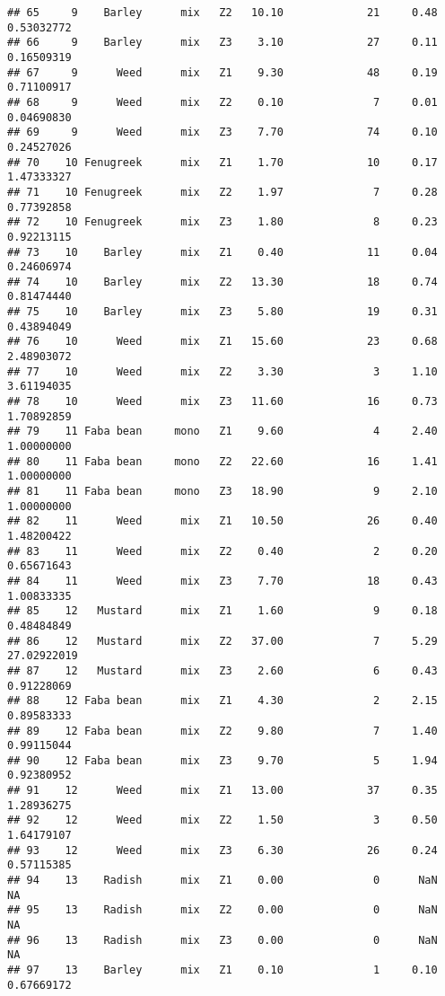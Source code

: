\documentclass[
]{article}
\begin{document}
\begin{verbatim}
## 65     9    Barley      mix   Z2   10.10             21     0.48  0.53032772
## 66     9    Barley      mix   Z3    3.10             27     0.11  0.16509319
## 67     9      Weed      mix   Z1    9.30             48     0.19  0.71100917
## 68     9      Weed      mix   Z2    0.10              7     0.01  0.04690830
## 69     9      Weed      mix   Z3    7.70             74     0.10  0.24527026
## 70    10 Fenugreek      mix   Z1    1.70             10     0.17  1.47333327
## 71    10 Fenugreek      mix   Z2    1.97              7     0.28  0.77392858
## 72    10 Fenugreek      mix   Z3    1.80              8     0.23  0.92213115
## 73    10    Barley      mix   Z1    0.40             11     0.04  0.24606974
## 74    10    Barley      mix   Z2   13.30             18     0.74  0.81474440
## 75    10    Barley      mix   Z3    5.80             19     0.31  0.43894049
## 76    10      Weed      mix   Z1   15.60             23     0.68  2.48903072
## 77    10      Weed      mix   Z2    3.30              3     1.10  3.61194035
## 78    10      Weed      mix   Z3   11.60             16     0.73  1.70892859
## 79    11 Faba bean     mono   Z1    9.60              4     2.40  1.00000000
## 80    11 Faba bean     mono   Z2   22.60             16     1.41  1.00000000
## 81    11 Faba bean     mono   Z3   18.90              9     2.10  1.00000000
## 82    11      Weed      mix   Z1   10.50             26     0.40  1.48200422
## 83    11      Weed      mix   Z2    0.40              2     0.20  0.65671643
## 84    11      Weed      mix   Z3    7.70             18     0.43  1.00833335
## 85    12   Mustard      mix   Z1    1.60              9     0.18  0.48484849
## 86    12   Mustard      mix   Z2   37.00              7     5.29 27.02922019
## 87    12   Mustard      mix   Z3    2.60              6     0.43  0.91228069
## 88    12 Faba bean      mix   Z1    4.30              2     2.15  0.89583333
## 89    12 Faba bean      mix   Z2    9.80              7     1.40  0.99115044
## 90    12 Faba bean      mix   Z3    9.70              5     1.94  0.92380952
## 91    12      Weed      mix   Z1   13.00             37     0.35  1.28936275
## 92    12      Weed      mix   Z2    1.50              3     0.50  1.64179107
## 93    12      Weed      mix   Z3    6.30             26     0.24  0.57115385
## 94    13    Radish      mix   Z1    0.00              0      NaN          NA
## 95    13    Radish      mix   Z2    0.00              0      NaN          NA
## 96    13    Radish      mix   Z3    0.00              0      NaN          NA
## 97    13    Barley      mix   Z1    0.10              1     0.10  0.67669172

\end{verbatim}
\end{document}
